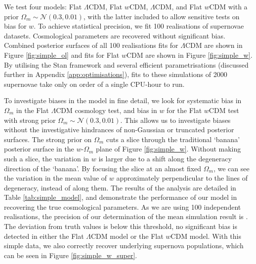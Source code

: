 \documentclass[twocolumn,trackchanges,tighten]{aastex62}
\begin{document}
We test four models: Flat $\Lambda$CDM, Flat $w$CDM, $\Lambda$CDM, and Flat $w$CDM with a prior $\Omega_m \sim \mathcal{N}(0.3, 0.01)$, with the latter included to allow sensitive tests on bias for $w$. To achieve statistical precision, we fit 100 realisations of supernovae datasets. Cosmological parameters are recovered without significant bias. Combined posterior surfaces of all 100 realisations fits for $\Lambda$CDM are shown in Figure \ref{fig:simple_ol} and fits for Flat $w$CDM are shown in Figure \ref{fig:simple_w}. By utilising the Stan framework and several efficient parametrisations (discussed further in Appendix \ref{app:optimisations}), fits to these simulations of 2000 supernovae take only on order of a single CPU-hour to run.

To investigate biases in the model in fine detail, we look for systematic bias in $\Omega_m$ in the Flat $\Lambda$CDM cosmology test, and bias in $w$ for the Flat $w$CDM test with strong prior $\Omega_m \sim \mathcal{N}(0.3, 0.01)$. This allows us to investigate biases without the investigative hindrances of non-Gaussian or truncated posterior surfaces. The strong prior on $\Omega_m$ cuts a slice through the traditional `banana' posterior surface in the $w$-$\Omega_m$ plane of Figure \ref{fig:simple_w}. Without making such a slice, the variation in $w$ is larger due to a shift along the degeneracy direction of the `banana'. By focusing the slice at an almost fixed $\Omega_m$, we can see the variation in the mean value of $w$ approximately perpendicular to the lines of degeneracy, instead of along them. The results of the analysis are detailed in Table \ref{tab:simple_model}, and demonstrate the performance of our model in recovering the true cosmological parameters.  As we are using 100 independent realisations, the precision of our determination of the mean simulation result is . The deviation from truth values is below this threshold, no significant bias is detected in either the Flat $\Lambda$CDM model or the Flat $w$CDM model. With this simple data, we also correctly recover underlying supernova populations, which can be seen in Figure \ref{fig:simple_w_super}.
\end{document}
